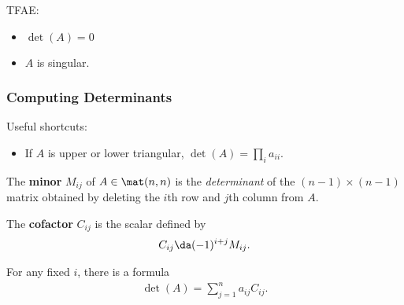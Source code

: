 \begin{proposition}

TFAE:

\begin{itemize}
\tightlist
\item
  \(\det(A) = 0\)
\item
  \(A\) is singular.
\end{itemize}

\end{proposition}

\hypertarget{computing-determinants}{%
\subsubsection{Computing Determinants}\label{computing-determinants}}

Useful shortcuts:

\begin{itemize}
\tightlist
\item
  If \(A\) is upper or lower triangular, \(\det(A) = \prod_i a_{ii}\).
\end{itemize}

\begin{definition}[Minors]

The \textbf{minor} \(M_{ij}\) of \(A\in \mat(n, n)\) is the
\emph{determinant} of the \((n-1) \times (n-1)\) matrix obtained by
deleting the \(i\)th row and \(j\)th column from \(A\).

\end{definition}

\begin{definition}[Cofactors]

\label{def:cofactor} The \textbf{cofactor} \(C_{ij}\) is the scalar
defined by
\begin{align*}  
C_{ij} \da (-1)^{i+j} M_{ij}
.\end{align*}

\end{definition}

\begin{proposition}

For any fixed \(i\), there is a formula
\begin{align*}  
\det(A) = \sum_{j=1}^n a_{ij} C_{ij}
.\end{align*}

\end{proposition}


